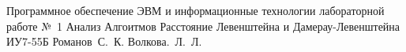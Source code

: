 \documentclass{bmstu}
\begin{document}
{Программное обеспечение ЭВМ и информационные технологии}
{лабораторной работе №~1}
{Анализ Алгоитмов}
{Расстояние Левенштейна и Дамерау-Левенштейна}
{}
{ИУ7-55Б}
{Романов~С.~К.}
{Волкова.~Л.~Л.}

\tableofcontents









%

\makebibliography
\end{document}
